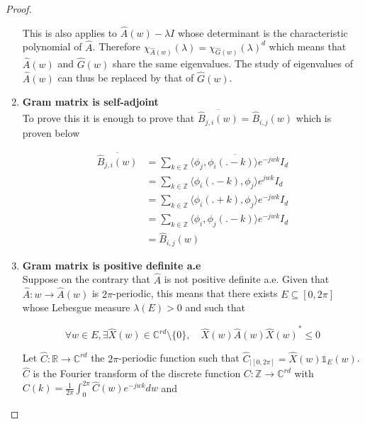 \documentclass[a4paper, 11pt]{article}
\begin{document}
\begin{proof}
\begin{enumerate}
        This is also applies to $\hat{A}(w) - \lambda I$ whose determinant is the characteristic polynomial of $\hat{A}$.  
        Therefore $\chi_{\hat{A}(w)}(\lambda) = \chi_{\hat{G}(w)}(\lambda)^d$ which means that $\hat{A}(w)$ and 
        $\hat{G}(w)$ share the same eigenvalues. The study of eigenvalues of $\hat{A}(w)$ can thus be replaced by that 
        of $\hat{G}(w)$.

      \item{\textbf{Gram matrix is self-adjoint}} \\
      To prove this it is enough to prove that $\overline{\hat{B}_{j,i}(w)} = \hat{B}_{i,j}(w)$ which is proven below
      
      \begin{align*}
        \overline{\hat{B}_{j,i}(w)} &= \sum_{k \in \mathbb{Z}} \overline{\langle \phi_j, \phi_i(.-k) \rangle e^{-jwk}} I_d 
        \\
        &= \sum_{k \in \mathbb{Z}} \langle \phi_i(.-k), \phi_j  \rangle e^{jwk} I_d \\
        &= \sum_{k \in \mathbb{Z}} \langle \phi_i(.+k), \phi_j  \rangle e^{-jwk} I_d \\
        &= \sum_{k \in \mathbb{Z}} \langle \phi_i, \phi_j(.-k)  \rangle e^{-jwk} I_d\\
        &= \hat{B}_{i,j}(w)
      \end{align*}

    \item{\textbf{Gram matrix is positive definite a.e}}\\
      Suppose on the contrary that $\hat{A}$ is not positive definite a.e. Given that $\hat{A}: w \to \hat{A}(w)$ is 
      $2\pi$-periodic, this means that there exists $E \subseteq [0,2\pi]$ whose Lebesgue measure $\lambda(E) > 0$ and 
      such that 
      
      \begin{equation*}
        \forall  w \in E,  \exists \hat{X}(w) \in \mathbb{C}^{rd}\setminus{\{0\}}, \quad \hat{X}(w) \hat{A}(w) 
        {\hat{X}(w)}^* \leq 0
      \end{equation*}

      Let $\hat{C}:\mathbb{R} \to \mathbb{C}^{rd}$ the $2\pi$-periodic function such that $\hat{C}_{|[0,2\pi]} = 
      \hat{X}(w) \mathds{1}_{E}(w)$. $\hat{C}$ is the Fourier transform of the discrete function $C: \mathbb{Z} \to 
      \mathbb{C}^{rd}$ with $\displaystyle C(k) = \frac{1}{2\pi} \int_0^{2\pi} \hat{C}(w) e^{-jwk} dw$ and 
      

\end{enumerate}
\end{proof}
\end{document}
